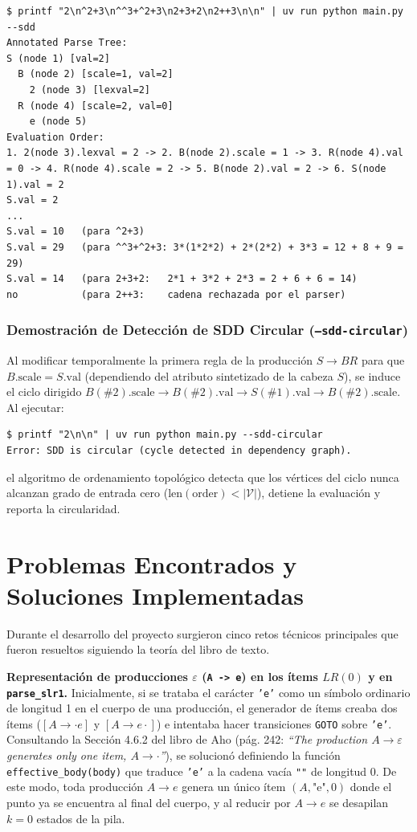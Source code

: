 \documentclass[11pt,a4paper]{article}
\begin{document}
\begin{lstlisting}
$ printf "2\n^2+3\n^^3+^2+3\n2+3+2\n2++3\n\n" | uv run python main.py --sdd
Annotated Parse Tree:
S (node 1) [val=2]
  B (node 2) [scale=1, val=2]
    2 (node 3) [lexval=2]
  R (node 4) [scale=2, val=0]
    e (node 5)
Evaluation Order:
1. 2(node 3).lexval = 2 -> 2. B(node 2).scale = 1 -> 3. R(node 4).val = 0 -> 4. R(node 4).scale = 2 -> 5. B(node 2).val = 2 -> 6. S(node 1).val = 2
S.val = 2
...
S.val = 10   (para ^2+3)
S.val = 29   (para ^^3+^2+3: 3*(1*2*2) + 2*(2*2) + 3*3 = 12 + 8 + 9 = 29)
S.val = 14   (para 2+3+2:   2*1 + 3*2 + 2*3 = 2 + 6 + 6 = 14)
no           (para 2++3:    cadena rechazada por el parser)
\end{lstlisting}

\subsubsection{Demostraci\'on de Detecci\'on de SDD Circular (\texttt{--sdd-circular})}
Al modificar temporalmente la primera regla de la producci\'on $S \to B R$ para que $B.\text{scale} = S.\text{val}$ (dependiendo del atributo sintetizado de la cabeza $S$), se induce el ciclo dirigido $B(\#2).\text{scale} \to B(\#2).\text{val} \to S(\#1).\text{val} \to B(\#2).\text{scale}$. Al ejecutar:
\begin{lstlisting}
$ printf "2\n\n" | uv run python main.py --sdd-circular
Error: SDD is circular (cycle detected in dependency graph).
\end{lstlisting}
el algoritmo de ordenamiento topol\'ogico detecta que los v\'ertices del ciclo nunca alcanzan grado de entrada cero ($\text{len}(\text{order}) < |\mathcal{V}|$), detiene la evaluaci\'on y reporta la circularidad.

\section{Problemas Encontrados y Soluciones Implementadas}

Durante el desarrollo del proyecto surgieron cinco retos t\'ecnicos principales que fueron resueltos siguiendo la teor\'ia del libro de texto.

\textbf{Representaci\'on de producciones $\varepsilon$ (\texttt{A -> e}) en los \'items $LR(0)$ y en \texttt{parse\_slr1}.} Inicialmente, si se trataba el car\'acter \texttt{'e'} como un s\'imbolo ordinario de longitud 1 en el cuerpo de una producci\'on, el generador de \'items creaba dos \'items ($[A \to \cdot e]$ y $[A \to e \cdot]$) e intentaba hacer transiciones \texttt{GOTO} sobre \texttt{'e'}. Consultando la Secci\'on 4.6.2 del libro de Aho (p\'ag. 242: \emph{``The production $A \to \varepsilon$ generates only one item, $A \to \cdot$''}), se solucion\'o definiendo la funci\'on \texttt{effective\_body(body)} que traduce \texttt{'e'} a la cadena vac\'ia \texttt{""} de longitud 0. De este modo, toda producci\'on $A \to e$ genera un \'unico \'item $(A, \text{"e"}, 0)$ donde el punto ya se encuentra al final del cuerpo, y al reducir por $A \to e$ se desapilan $k = 0$ estados de la pila.
\end{document}
